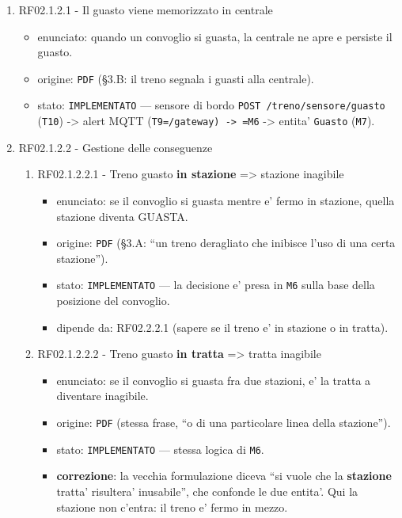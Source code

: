 \documentclass[11pt]{article}
\begin{document}
\begin{enumerate}
\item RF02.1.2.1 - Il guasto viene memorizzato in centrale
\label{sec:orge1f62c4}
\begin{itemize}
\item enunciato: quando un convoglio si guasta, la centrale ne apre e persiste il guasto.
\item origine: \texttt{PDF} (§3.B: il treno segnala i guasti alla centrale).
\item stato: \texttt{IMPLEMENTATO} — sensore di bordo \texttt{POST /treno/sensore/guasto} (\texttt{T10}) -> alert MQTT
(\texttt{T9=/gateway) -> =M6} -> entita' \texttt{Guasto} (\texttt{M7}).
\end{itemize}
\item RF02.1.2.2 - Gestione delle conseguenze
\label{sec:org1ebf4a3}

\begin{enumerate}
\item RF02.1.2.2.1 - Treno guasto \textbf{in stazione} => stazione inagibile
\label{sec:org6c8502a}
\begin{itemize}
\item enunciato: se il convoglio si guasta mentre e' fermo in stazione, quella stazione diventa GUASTA.
\item origine: \texttt{PDF} (§3.A: ``un treno deragliato che inibisce l'uso di una certa stazione'').
\item stato: \texttt{IMPLEMENTATO} — la decisione e' presa in \texttt{M6} sulla base della posizione del convoglio.
\item dipende da: RF02.2.2.1 (sapere se il treno e' in stazione o in tratta).
\end{itemize}
\item RF02.1.2.2.2 - Treno guasto \textbf{in tratta} => tratta inagibile
\label{sec:orgd7de3dd}
\begin{itemize}
\item enunciato: se il convoglio si guasta fra due stazioni, e' la tratta a diventare inagibile.
\item origine: \texttt{PDF} (stessa frase, ``o di una particolare linea della stazione'').
\item stato: \texttt{IMPLEMENTATO} — stessa logica di \texttt{M6}.
\item \textbf{correzione}: la vecchia formulazione diceva ``si vuole che la \textbf{stazione} tratta' risultera'
inusabile'', che confonde le due entita'. Qui la stazione non c'entra: il treno e' fermo in mezzo.
\end{itemize}
\end{enumerate}
\end{enumerate}
\end{document}
